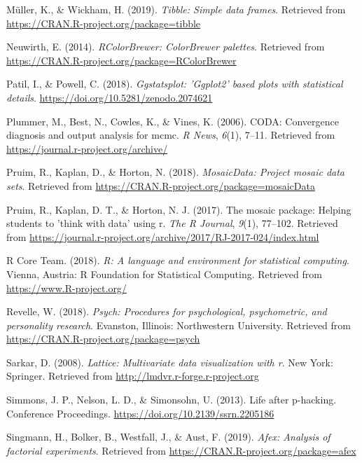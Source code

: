 \documentclass[man]{apa6}
\begin{document}
\leavevmode\hypertarget{ref-R-tibble}{}%
Müller, K., \& Wickham, H. (2019). \emph{Tibble: Simple data frames}. Retrieved from \url{https://CRAN.R-project.org/package=tibble}

\leavevmode\hypertarget{ref-R-RColorBrewer}{}%
Neuwirth, E. (2014). \emph{RColorBrewer: ColorBrewer palettes}. Retrieved from \url{https://CRAN.R-project.org/package=RColorBrewer}

\leavevmode\hypertarget{ref-R-ggstatsplot}{}%
Patil, I., \& Powell, C. (2018). \emph{Ggstatsplot: 'Ggplot2' based plots with statistical details}. \url{https://doi.org/10.5281/zenodo.2074621}

\leavevmode\hypertarget{ref-R-coda}{}%
Plummer, M., Best, N., Cowles, K., \& Vines, K. (2006). CODA: Convergence diagnosis and output analysis for mcmc. \emph{R News}, \emph{6}(1), 7--11. Retrieved from \url{https://journal.r-project.org/archive/}

\leavevmode\hypertarget{ref-R-mosaicData}{}%
Pruim, R., Kaplan, D., \& Horton, N. (2018). \emph{MosaicData: Project mosaic data sets}. Retrieved from \url{https://CRAN.R-project.org/package=mosaicData}

\leavevmode\hypertarget{ref-R-mosaic}{}%
Pruim, R., Kaplan, D. T., \& Horton, N. J. (2017). The mosaic package: Helping students to 'think with data' using r. \emph{The R Journal}, \emph{9}(1), 77--102. Retrieved from \url{https://journal.r-project.org/archive/2017/RJ-2017-024/index.html}

\leavevmode\hypertarget{ref-R-base}{}%
R Core Team. (2018). \emph{R: A language and environment for statistical computing}. Vienna, Austria: R Foundation for Statistical Computing. Retrieved from \url{https://www.R-project.org/}

\leavevmode\hypertarget{ref-R-psych}{}%
Revelle, W. (2018). \emph{Psych: Procedures for psychological, psychometric, and personality research}. Evanston, Illinois: Northwestern University. Retrieved from \url{https://CRAN.R-project.org/package=psych}

\leavevmode\hypertarget{ref-R-lattice}{}%
Sarkar, D. (2008). \emph{Lattice: Multivariate data visualization with r}. New York: Springer. Retrieved from \url{http://lmdvr.r-forge.r-project.org}

\leavevmode\hypertarget{ref-Simmons_2013_life}{}%
Simmons, J. P., Nelson, L. D., \& Simonsohn, U. (2013). Life after p-hacking. Conference Proceedings. \url{https://doi.org/10.2139/ssrn.2205186}

\leavevmode\hypertarget{ref-R-afex}{}%
Singmann, H., Bolker, B., Westfall, J., \& Aust, F. (2019). \emph{Afex: Analysis of factorial experiments}. Retrieved from \url{https://CRAN.R-project.org/package=afex}
\end{document}
